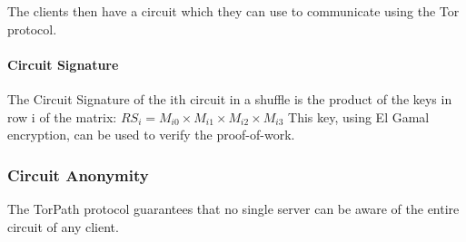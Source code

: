 {The clients then have a circuit which they can use to communicate using the Tor 
protocol.

\paragraph{Circuit Signature}
The Circuit Signature of the ith circuit in a shuffle is the product of the keys
in row i of the matrix:
$RS_i = M_{i0} \times M_{i1} \times M_{i2} \times M_{i3}$
This key, using El Gamal encryption, can be used to verify the proof-of-work.

\subsubsection{Circuit Anonymity} 
The TorPath protocol guarantees that no single server can be aware of the entire
circuit of any client. 







}
